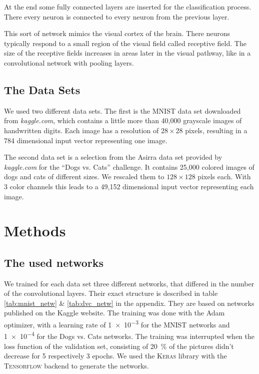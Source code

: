 \documentclass[%
 reprint,
 amsmath,amssymb,
 aps,
]{revtex4-1}
\begin{document}
At the end some fully connected layers are inserted for the classification process. There every neuron is connected to every neuron from the previous layer.

This sort of network mimics the visual cortex of the brain. There neurons typically respond to a small region of the visual field called receptive field. The size of the receptive fields increases in areas later in the visual pathway, like in a convolutional network with pooling layers.

\subsection{The Data Sets}

We used two different data sets. The first is the MNIST data set downloaded from \emph{kaggle.com}, which contains a little more than 40,000 grayscale images of handwritten digits. Each image has a resolution of $28\times 28$ pixels, resulting in a 784 dimensional input vector representing one image. 

The second data set is a selection from the Asirra data set provided by \emph{kaggle.com} for the ``Dogs vs. Cats'' challenge. It contains 25,000 colored images of dogs and cats of different sizes. We rescaled them to $128\times 128$ pixels each. With 3 color channels this leads to a 49,152 dimensional input vector representing each image. 
\section{Methods}

\subsection{The used networks}

We trained for each data set three different networks, that differed in the number of the convolutional layers. Their exact structure is described in table \ref{tab:mnist_netw} \& \ref{tab:dvc_netw} in the appendix. They are based on networks published on the Kaggle website. The training was done with the Adam optimizer, with a learning rate of \SI{1e-3}{} for the MNIST networks and \SI{1e-4}{} for the Dogs vs. Cats networks. The training was interrupted when the loss function of the validation set, consisting of \SI{20}{\percent} of the pictures didn't decrease for 5 respectively 3 epochs. 
We used the \textsc{Keras} library with the \textsc{Tensorflow} backend to generate the networks.
\end{document}
